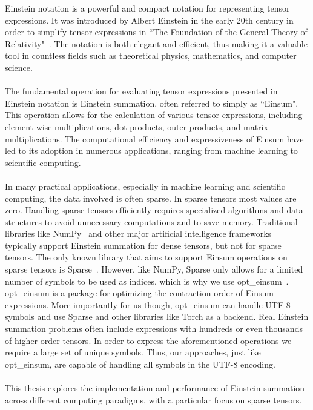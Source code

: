 Einstein notation is a powerful and compact notation for representing
tensor expressions. It was introduced by Albert Einstein in the early 20th century
in order to simplify tensor expressions in ``The Foundation of the General Theory of 
Relativity"~\cite{einstein1916}. The notation is both elegant and efficient, 
thus making it a valuable tool in countless fields such as theoretical physics, 
mathematics, and computer science.
\\\\
The fundamental operation for evaluating tensor expressions presented in Einstein 
notation is Einstein summation, often referred to simply as ``Einsum". This operation 
allows for the calculation of various tensor expressions, including element-wise 
multiplications, dot products, outer products, and matrix multiplications. The computational 
efficiency and expressiveness of Einsum have led to its adoption in numerous applications,
ranging from machine learning to scientific computing.
\\\\
In many practical applications, especially in machine learning and scientific computing,
the data involved is often sparse. In sparse tensors most values are zero. Handling sparse
tensors efficiently requires specialized algorithms and data structures to avoid
unnecessary computations and to save memory. Traditional libraries like NumPy~\cite{numpy}
and other major artificial intelligence frameworks~\cite{tensorflow, pytorch} typically
support Einstein summation for dense tensors, but not for sparse tensors. The only known
library that aims to support Einsum operations on sparse tensors is Sparse~\cite{sparse}.
However, like NumPy, Sparse only allows for a limited number of symbols to be used as
indices, which is why we use opt\_einsum~\cite{opt_einsum}. opt\_einsum is a package for 
optimizing the contraction order of Einsum expressions. More importantly for us though, 
opt\_einsum can handle UTF-8 symbols and use Sparse and other libraries like Torch
as a backend. Real Einstein summation problems often include expressions with hundreds or
even thousands of higher order tensors. In order to express the aforementioned operations
we require a large set of unique symbols. Thus, our approaches, just like opt\_einsum, are
capable of handling all symbols in the UTF-8 encoding.
\\\\
This thesis explores the implementation and performance of Einstein summation
across different computing paradigms, with a particular focus on sparse tensors.
